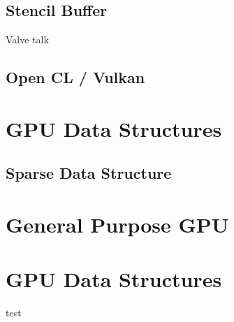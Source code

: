 \subsection{Stencil Buffer}
Valve talk

\subsection{Open CL / Vulkan}
\section{GPU Data Structures}
\subsection{Sparse Data Structure}

\section{General Purpose GPU}

\section{GPU Data Structures}

test \cite{Heuser:2003}